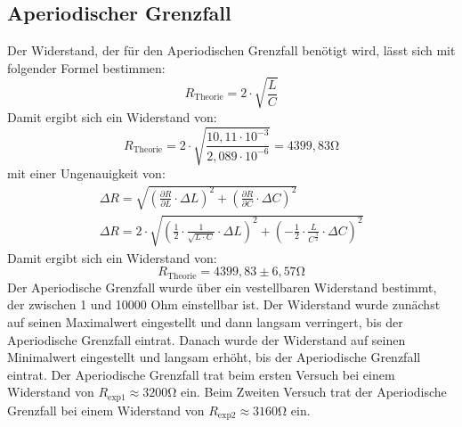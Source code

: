\subsection{Aperiodischer Grenzfall}
Der Widerstand, der für den Aperiodischen Grenzfall benötigt wird, lässt sich mit folgender Formel bestimmen:
\begin{equation}
    R_{\text{Theorie}} = 2 \cdot \sqrt{\frac{L}{C}}
\end{equation}
Damit ergibt sich ein Widerstand von:
\begin{equation}
    R_{\text{Theorie}} = 2 \cdot \sqrt{\frac{10,11 \cdot 10^{-3}}{2,089 \cdot 10^{-6}}} = 4399,83 \mathrm{\Omega}
\end{equation}
mit einer Ungenauigkeit von:
\begin{gather}
    \Delta R = \sqrt{(\frac{\partial R}{\partial L} \cdot \Delta L)^2 + (\frac{\partial R}{\partial C} \cdot \Delta C)^2}\\
    \Delta R = 2 \cdot \sqrt{(\frac{1}{2} \cdot \frac{1}{\sqrt{L \cdot C}} \cdot \Delta L)^2 + (-\frac{1}{2} \cdot \frac{L}{C^{\frac{3}{2}}} \cdot \Delta C)^2}
\end{gather}
Damit ergibt sich ein Widerstand von:
\begin{equation}
    R_{\text{Theorie}} = 4399,83 \pm 6,57 \mathrm{\Omega}
\end{equation}
Der Aperiodische Grenzfall wurde über ein vestellbaren Widerstand bestimmt, der zwischen 1 und 10000 Ohm einstellbar ist.
 Der Widerstand wurde zunächst auf seinen Maximalwert eingestellt und dann langsam verringert, bis der Aperiodische Grenzfall eintrat. 
 Danach wurde der Widerstand auf seinen Minimalwert eingestellt und langsam erhöht, bis der Aperiodische Grenzfall eintrat. 
Der Aperiodische Grenzfall trat beim ersten Versuch bei einem Widerstand von $R_{\text{exp1}} \approx 3200 \mathrm{\Omega}$ ein.
Beim Zweiten Versuch trat der Aperiodische Grenzfall bei einem Widerstand von $R_{\text{exp2}} \approx 3160 \mathrm{\Omega}$ ein.
